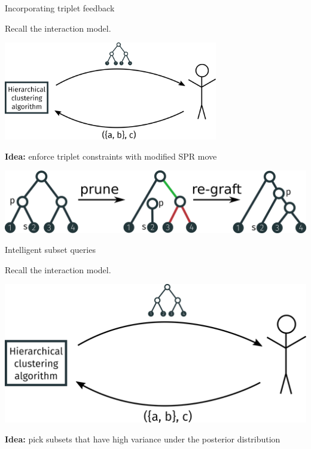 \documentclass[10pt, compress]{beamer}
\begin{document}
\begin{frame}{Incorporating triplet feedback}

  Recall the interaction model.

  \begin{center}
    \includegraphics[width=0.7\textwidth]{img/interaction-3}
  \end{center}
  \pause

  \textbf{Idea:}  enforce triplet constraints with
  modified SPR move

  \pause

  \begin{center}
    \includegraphics[width=\textwidth]{img/cspr-animation}
  \end{center}
\end{frame}

\iffalse
\begin{frame}{Intelligent subset queries}

  Recall the interaction model.

  \begin{center}
    \includegraphics[width=\textwidth]{img/interaction-3}
  \end{center}

  \pause



  \textbf{Idea:}  pick subsets that have high variance
  under the posterior distribution

\end{frame}
\end{document}
